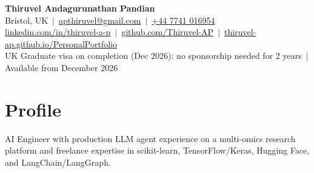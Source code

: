 \documentclass[a4paper,10pt]{article}
\begin{document}
\fontsize{10.5}{12.6}\selectfont

\begin{center}
  {\LARGE\bfseries Thiruvel Andagurunathan Pandian}\\[3pt]
  Bristol, UK \,$|$\, \href{mailto:apthiruvel@gmail.com}{apthiruvel@gmail.com} \,$|$\, \href{tel:+447741016954}{+44 7741 016954}\\[1pt]
\href{https://www.linkedin.com/in/thiruvel-a-p/}{linkedin.com/in/thiruvel-a-p} \,$|$\, \href{https://github.com/Thiruvel-AP}{github.com/Thiruvel-AP} \,$|$\, \href{https://thiruvel-ap.github.io/PersonalPortfolio/}{thiruvel-ap.github.io/PersonalPortfolio}\\[1pt]
  UK Graduate visa on completion (Dec 2026): no sponsorship needed for 2 years \,$|$\, Available from December 2026
\end{center}

\section{Profile}
AI Engineer with production LLM agent experience on a multi-omics research platform and freelance expertise in scikit-learn, TensorFlow/Keras, Hugging Face, and LangChain/LangGraph.

\end{document}
